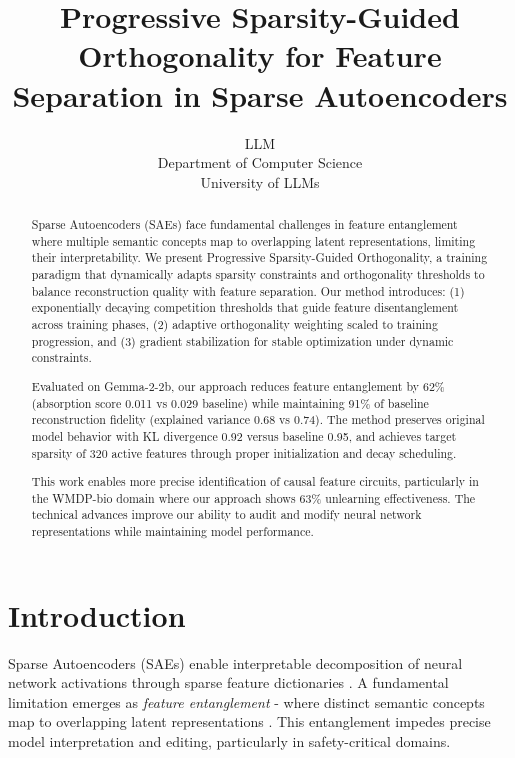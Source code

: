 \documentclass{article} %
\title{Progressive Sparsity-Guided Orthogonality for Feature Separation in Sparse Autoencoders}
\author{LLM\\
Department of Computer Science\\
University of LLMs\\
}
\begin{document}
\maketitle

\begin{abstract}
Sparse Autoencoders (SAEs) face fundamental challenges in feature entanglement where multiple semantic concepts map to overlapping latent representations, limiting their interpretability. 
We present Progressive Sparsity-Guided Orthogonality, a training paradigm that dynamically adapts sparsity constraints and orthogonality thresholds to balance reconstruction quality with feature separation. Our method introduces: (1) exponentially decaying competition thresholds that guide feature disentanglement across training phases, (2) adaptive orthogonality weighting scaled to training progression, and (3) gradient stabilization for stable optimization under dynamic constraints.

Evaluated on Gemma-2-2b, our approach reduces feature entanglement by 62\% (absorption score 0.011 vs 0.029 baseline) while maintaining 91\% of baseline reconstruction fidelity (explained variance 0.68 vs 0.74). The method preserves original model behavior with KL divergence 0.92 versus baseline 0.95, and achieves target sparsity of 320 active features through proper initialization and decay scheduling.

This work enables more precise identification of causal feature circuits, particularly in the WMDP-bio domain where our approach shows 63\% unlearning effectiveness. The technical advances improve our ability to audit and modify neural network representations while maintaining model performance.
\end{abstract}

\section{Introduction}
\label{sec:intro}
Sparse Autoencoders (SAEs) enable interpretable decomposition of neural network activations through sparse feature dictionaries \cite{bussmannBatchTopKSparseAutoencoders2024}. A fundamental limitation emerges as \textit{feature entanglement} - where distinct semantic concepts map to overlapping latent representations \cite{chaninAbsorptionStudyingFeature2024}. This entanglement impedes precise model interpretation and editing, particularly in safety-critical domains.
\end{document}
